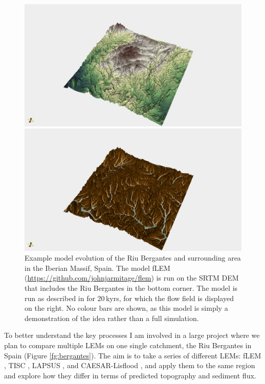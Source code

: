 \begin{figure}
\begin{minipage}{\textwidth}
\begin{minipage}{.5\textwidth}
\includegraphics[width=.98\textwidth]{./figures/ch3-bergantes-elevation.png}
\end{minipage}
\begin{minipage}{.5\textwidth}
\includegraphics[width=.98\textwidth]{./figures/ch3-bergantes-flow.png}
\end{minipage}
\end{minipage}
\caption{Example model evolution of the Riu Bergantes and surrounding area in the Iberian Massif, Spain. The model fLEM (\url{https://github.com/johnjarmitage/flem}) is run on the SRTM DEM that includes the Riu Bergantes in the bottom corner. The model is run as described in \cite{armitage-2019} for 20\,kyrs, for which the flow field is displayed on the right. No colour bars are shown, as this model is simply a demonstration of the idea rather than a full simulation.}
\label{fg:bergnates}
\end{figure}

To better understand the key processes I am involved in a large project where we plan to compare multiple LEMs on one single catchment, the Riu Bergantes in Spain (Figure \ref{fg:bergantes}). The aim is to take a series of different LEMs: fLEM \citep{armitage-2019}, TISC \citep{garcia-castellanos-2002}, LAPSUS \citep{schoorl-etal-2000}, and CAESAR-Lisflood \citep{coulthard-etal-2013}, and apply them to the same region and explore how they differ in terms of predicted topography and sediment flux.

